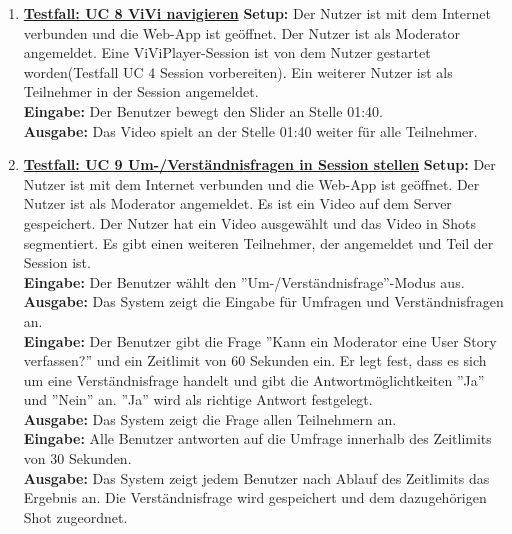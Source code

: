 \begin{enumerate}
	\item \underline{\textbf{Testfall: UC 8 ViVi navigieren}} \linebreak
	\textbf{Setup:} Der Nutzer ist mit dem Internet verbunden und die Web-App ist geöffnet. Der Nutzer ist als Moderator angemeldet. Eine ViViPlayer-Session ist von dem Nutzer gestartet worden(Testfall UC 4 Session vorbereiten). Ein weiterer Nutzer ist als Teilnehmer in der Session angemeldet. \\
	\textbf{Eingabe:} Der Benutzer bewegt den Slider an Stelle 01:40. \\
	\textbf{Ausgabe:} Das Video spielt an der Stelle 01:40 weiter für alle Teilnehmer.\\
	
	\item \underline{\textbf{Testfall: UC 9 Um-/Verständnisfragen in Session stellen}} \linebreak
	\textbf{Setup:} Der Nutzer ist mit dem Internet verbunden und die Web-App ist geöffnet. Der Nutzer ist als Moderator angemeldet. Es ist ein Video auf dem Server gespeichert. Der Nutzer hat ein Video ausgewählt und das Video in Shots segmentiert. Es gibt einen weiteren Teilnehmer, der angemeldet und Teil der Session ist.\\
	\textbf{Eingabe:} Der Benutzer wählt den ''Um-/Verständnisfrage''-Modus aus. \\
	\textbf{Ausgabe:} Das System zeigt die Eingabe für Umfragen und Verständnisfragen an.\\ 
	\textbf{Eingabe:} Der Benutzer gibt die Frage ''Kann ein Moderator eine User Story verfassen?'' und ein Zeitlimit von 60 Sekunden ein. Er legt fest, dass es sich um eine Verständnisfrage handelt und gibt die Antwortmöglichtkeiten ''Ja'' und ''Nein'' an. ''Ja'' wird als richtige Antwort festgelegt.\\
	\textbf{Ausgabe:} Das System zeigt die Frage allen Teilnehmern an.\\ 
	\textbf{Eingabe:} Alle Benutzer antworten auf die Umfrage innerhalb des Zeitlimits von 30 Sekunden.\\
	\textbf{Ausgabe:} Das System zeigt jedem Benutzer nach Ablauf des Zeitlimits das Ergebnis an. Die Verständnisfrage wird gespeichert und dem dazugehörigen Shot zugeordnet.\\
	

\end{enumerate}
